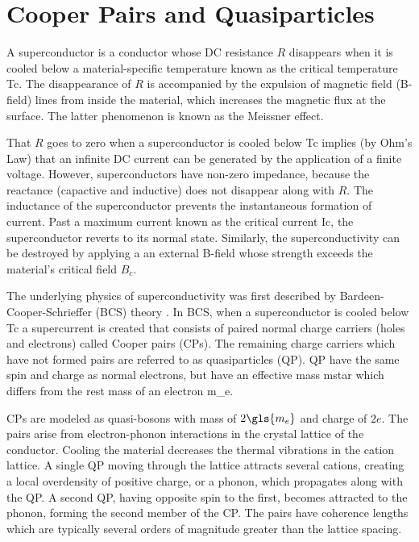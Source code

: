 \section{Cooper Pairs and Quasiparticles}\label{sec:supercond}

A superconductor is a conductor whose DC resistance $R$ disappears when it is cooled below a material-specific temperature known as the critical temperature \gls{Tc}. The disappearance of $R$ is accompanied by the expulsion of magnetic field (B-field) lines from inside the material, which increases the magnetic flux at the surface. The latter phenomenon is known as the Meissner effect.

That $R$ goes to zero when a superconductor is cooled below \gls{Tc} implies (by Ohm's Law) that an infinite DC current can be generated by the application of a finite voltage. However, superconductors have non-zero impedance, because the reactance (capactive and inductive) does not disappear along with $R$. The inductance of the superconductor prevents the instantaneous formation of current. Past a maximum current known as the critical current \gls{Ic}, the superconductor reverts to its normal state. Similarly, the superconductivity can be destroyed by applying a an external B-field whose strength exceeds the material's critical field $B_{c}$.

The underlying physics of superconductivity was first described by Bardeen-Cooper-Schrieffer (BCS) theory \citep{bardeen1957theory}. In BCS, when a superconductor is cooled below \gls{Tc} a supercurrent is created that consists of paired normal charge carriers (holes and electrons) called Cooper pairs (CPs). The remaining charge carriers which have not formed pairs are referred to as quasiparticles (QP). QP have the same spin and charge as normal electrons, but have an effective mass \gls{mstar} which differs from the rest mass of an electron \gls{m_e}.

CPs are modeled as quasi-bosons with mass of $2\gls{m_e}$ and charge of $2e$. The pairs arise from electron-phonon interactions in the crystal lattice of the conductor. Cooling the material decreases the thermal vibrations in the cation lattice. A single QP moving through the lattice attracts several cations, creating a local overdensity of positive charge, or a phonon, which propagates along with the QP. A second QP, having opposite spin to the first, becomes attracted to the phonon, forming the second member of the CP. The pairs have coherence lengths which are typically several orders of magnitude greater than the lattice spacing.

